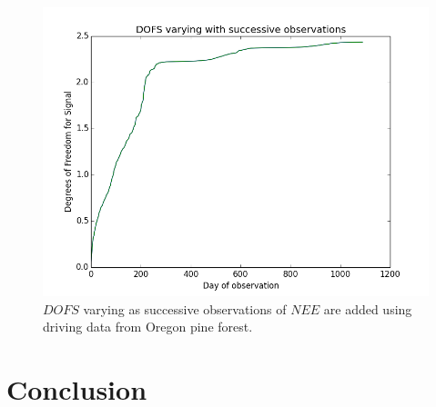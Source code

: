 \documentclass[11pt]{article}
\begin{document}
\begin{figure}[h]
\centering
\includegraphics[width=.9\textwidth]{DOFS_0_1090Cf_Cpoolsconst.png}
\caption{$DOFS$ varying as successive observations of $NEE$ are added using driving data from Oregon pine forest.}
\label{fig:SIC_subplot}
\end{figure}

\section{Conclusion}

{}

\end{document}
